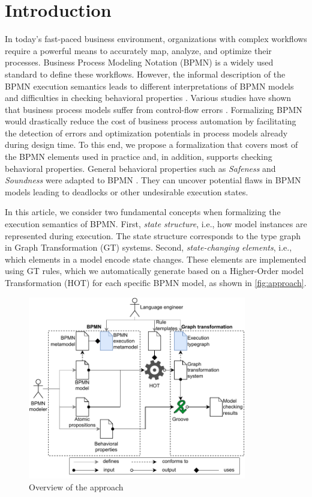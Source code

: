 \documentclass{lmcs} %
\begin{document}
\section{Introduction}
In today's fast-paced business environment, organizations with complex workflows require a powerful means to accurately map, analyze, and optimize their processes. 
Business Process Modeling Notation (BPMN) \cite{objectmanagementgroupBusinessProcessModel2013} is a widely used standard to define these workflows.
However, the informal description of the BPMN execution semantics leads to different interpretations of BPMN models and difficulties in checking behavioral properties \cite{corradiniFormalApproachAnalysis2021}.
Various studies have shown that business process models suffer from control-flow errors \cite{mendlingEmpiricalStudiesProcess2009}.
Formalizing BPMN would drastically reduce the cost of business process automation by facilitating the detection of errors and optimization potentials in process models already during design time.
To this end, we propose a formalization that covers most of the BPMN elements used in practice and, in addition, supports checking behavioral properties.
General behavioral properties such as \textit{Safeness} and \textit{Soundness} were adapted to BPMN \cite{corradiniClassificationBPMNCollaborations2018}. They can uncover potential flaws in BPMN models leading to deadlocks or other undesirable execution states.

In this article, we consider two fundamental concepts when formalizing the execution semantics of BPMN.
First, \textit{state structure}, i.e., how model instances are represented during execution.
The state structure corresponds to the type graph in Graph Transformation (GT) systems.
Second, \textit{state-changing elements}, i.e., which elements in a model encode state changes.
These elements are implemented using GT rules, which we automatically generate based on a Higher-Order model Transformation (HOT) \cite{tisiUseHigherOrderModel2009} for each specific BPMN model, as shown in \autoref{fig:approach}.

\begin{figure}[ht]
    \centering
    \includegraphics[width=0.85\textwidth]{images/bpmn_semantics-overview.pdf}
    \caption{Overview of the approach}
    \label{fig:approach}
\end{figure}
\end{document}
